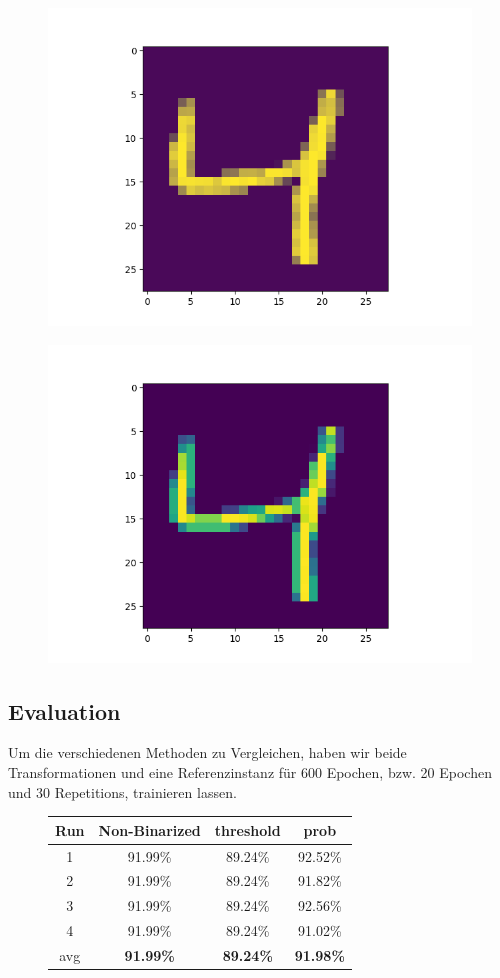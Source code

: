 \begin{figure}[h]
\centering
\begin{minipage}{.5\textwidth}
  \centering
  \includegraphics[width=.4\linewidth]{./bilder/comparison/overlapped}
  \label{fig:bin3}
\end{minipage}%
\begin{minipage}{.5\textwidth}
  \centering
  \includegraphics[width=.4\linewidth]{./bilder/comparison/default}
  \label{fig:dflt}
\end{minipage}
\end{figure}

\subsection{Evaluation}

Um die verschiedenen Methoden zu Vergleichen, haben wir beide Transformationen und eine Referenzinstanz für $600$ Epochen, bzw. 20 Epochen und 30 Repetitions, trainieren lassen.\\

	\begin{figure}
		
	\centering
	\begin{tabular}{|c|c|c|c|}\hline
		
		Run & Non-Binarized    & threshold        & prob              \\\hline
		1   	& 91.99\%          & 89.24\%          & 92.52\%           \\\hline
		2   & 91.99\%          & 89.24\%          & 91.82\%           \\\hline
		3   & 91.99\%          & 89.24\%          & 92.56\%           \\\hline
		4   & 91.99\%          & 89.24\%          & 91.02\%           \\\hline
		avg & \textbf{91.99\%} & \textbf{89.24\%} & \textbf{91.98\%}  \\\hline
	\end{tabular}
	\label{fig:grph}
\end{figure}

